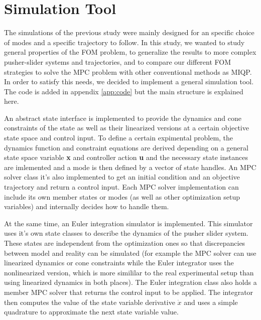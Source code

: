 \documentclass[12,twoside]{TFG-GM}
\theoremstyle{definition}
\theoremstyle{remark}
\begin{document}
\section{Simulation Tool}
\label{sec:sim}

The simulations of the previous study were mainly designed for an specific choice of modes and a specific trajectory to follow. In this study, we wanted to study general properties of the FOM problem, to generalize the results to more complex pusher-slider systems and trajectories, and to compare our different FOM strategies to solve the MPC problem with other conventional methods as MIQP. In order to satisfy this needs, we decided to implement a general simulation tool. The code is added in appendix \ref{app:code} but the main structure is explained here.

An abstract state interface is implemented to provide the dynamics and cone constraints of the state as well as their linearized versions at a certain objective state space and control input. To define a certain expimental problem, the dynamics function and constraint equations are derived depending on a general state space variable \textbf{x} and controller action \textbf{u} and the necessary state instances are imlemented and a mode is then defined by a vector of state handles. An MPC solver class it's also implemented to get an initial condition and an objective trajectory and return a control input. Each MPC solver implementation can include its own member states or modes (as well as other optimization setup variables) and internally decides how to handle them.

At the same time, an Euler integration simulator is implemented. This simulator uses it's own state classes to describe the dynamics of the pusher slider system. These states are independent from the optimization ones so that discrepancies between model and reality can be simulated (for example the MPC solver can use linearized dynamics or cone constraints while the Euler integrator uses the nonlinearized version, which is more simililar to the real experimental setup than using linearized dynamics in both places). The Euler integration class also holds a member MPC solver that returns the control input to be applied. The integrator then computes the value of the state variable derivative $\dot{x}$ and uses a simple quadrature to approximate the next state variable value.
\end{document}
